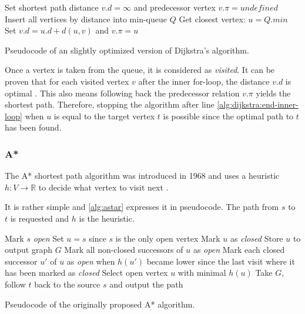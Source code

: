 			\begin{algorithm}[h]
				\begin{algorithmic}[1]
						\State Set shortest path distance $v.d = \infty$ and predecessor vertex $v.\pi = undefined$
					\EndFor
					\State Insert all vertices by distance into min-queue $Q$
					\State
						\State Get closest vertex: $u = Q.min$
								\State Set $v.d = u.d + d(u, v)$ and $v.\pi = u$
							\EndIf
						\EndFor \label{alg:dijkstra:end-inner-loop}
					\EndWhile
				\end{algorithmic}
				\caption{Pseudocode of an slightly optimized version of Dijkstra's algorithm.}
				\label{alg:dijkstra}
			\end{algorithm}
		
			Once a vertex is taken from the queue, it is considered as \emph{visited}.
			It can be proven that for each visited vertex $v$ after the inner for-loop, the distance $v.d$ is optimal \cite[659-661]{cormen-introduction-to-alg}.
			This also means following back the predecessor relation $v.\pi$ yields the shortest path.
			Therefore, stopping the algorithm after line \ref{alg:dijkstra:end-inner-loop} when $u$ is equal to the target vertex $t$ is possible since the optimal path to $t$ has been found.
		
		\subsubsection{A*}
		\label{subsubsec:astar}
		
			The A* shortest path algorithm was introduced in 1968 and uses a heuristic $h : V \rightarrow \mathbb{R}$ to decide what vertex to visit next \cite{astar}.
			
			It is rather simple and \cref{alg:astar} expresses it in pseudocode.
			The path from $s$ to $t$ is requested and $h$ is the heuristic.
			
			\begin{algorithm}[h]
				\begin{algorithmic}[1]
					\State Mark $s$ \emph{open}
					\State Set $u = s$ since $s$ is the only open vertex
						\State Mark $u$ as \emph{closed}
						\State Store $u$ to output graph $G$
						\State Mark all non-closed successors of $u$ as \emph{open}
						\State Mark each closed successor $u'$ of $u$ as \emph{open} when $h(u')$ became lower since the last visit where it has been marked as \emph{closed}
						\State Select open vertex $u$ with minimal $h(u)$
					\EndWhile
					\State Take $G$, follow $t$ back to the source $s$ and output the path
				\end{algorithmic}
				\caption{Pseudocode of the originally proposed A* algorithm.}
				\label{alg:astar}
			\end{algorithm}
		
